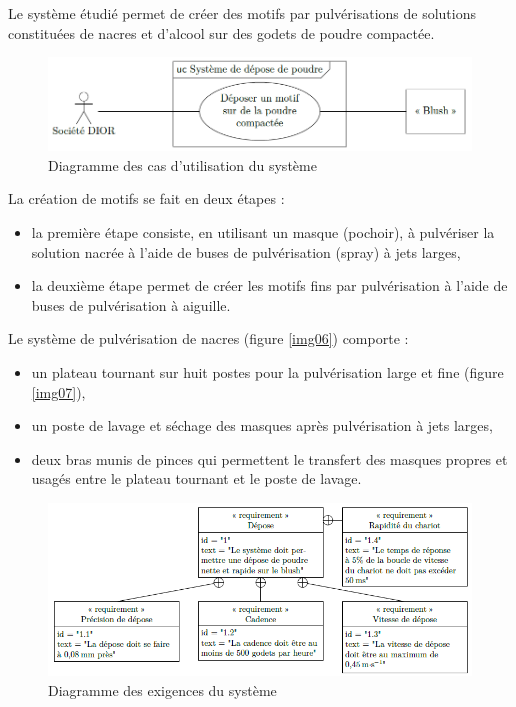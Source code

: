 Le système étudié permet de créer des motifs par pulvérisations de solutions constituées de nacres et d’alcool sur des godets de poudre compactée.

\begin{figure}[!h]
\centering\includegraphics[width=0.8\linewidth]{img/fig02}
 \caption{Diagramme des cas d’utilisation du système}
 \label{img02}
\end{figure}

La création de motifs se fait en deux étapes :
\begin{itemize}
 \item la première étape consiste, en utilisant un masque (pochoir), à pulvériser la solution nacrée à l’aide de buses de pulvérisation (spray) à jets larges,
 \item la deuxième étape permet de créer les motifs fins par pulvérisation à l’aide de buses de pulvérisation à aiguille.
\end{itemize}

Le système de pulvérisation de nacres (figure \ref{img06}) comporte :
\begin{itemize}
 \item un plateau tournant sur huit postes pour la pulvérisation large et fine (figure \ref{img07}),
 \item un poste de lavage et séchage des masques après pulvérisation à jets larges,
 \item deux bras munis de pinces qui permettent le transfert des masques propres et usagés entre le plateau tournant et le poste de lavage.
\end{itemize}

\begin{figure}[!h]
\centering\includegraphics[width=0.8\linewidth]{img/fig03}
 \caption{Diagramme des exigences du système}
 \label{img03}
\end{figure}

